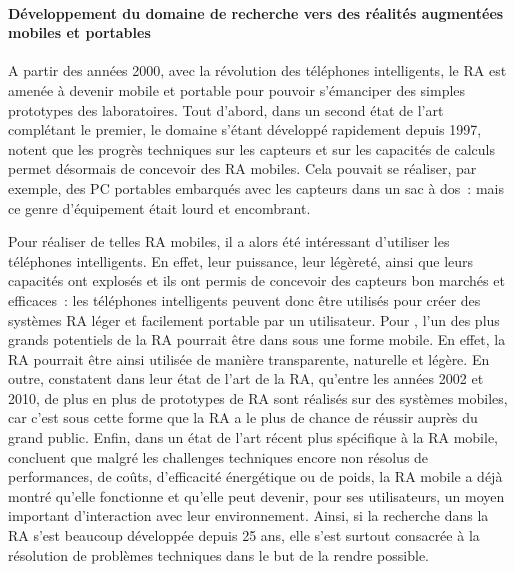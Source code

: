 
\paragraph*{Développement du domaine de recherche vers des réalités augmentées mobiles et portables}
A partir des années 2000, avec la révolution des téléphones intelligents, le RA est amenée à devenir mobile et portable pour pouvoir s'émanciper des simples prototypes des laboratoires. Tout d'abord, dans un second état de l'art complétant le premier, le domaine s'étant développé rapidement depuis 1997, \citet{AzumaBaillotBehringerEtAl2001} notent que les progrès techniques sur les capteurs et sur les capacités de calculs permet désormais de concevoir des RA mobiles. Cela pouvait se réaliser, par exemple, des PC portables embarqués avec les capteurs dans un sac à dos~: mais ce genre d'équipement était lourd et encombrant. \citep{DeSaChurchill2013}

Pour réaliser de telles RA mobiles, il a alors été intéressant d'utiliser les téléphones intelligents. En effet, leur puissance, leur légèreté, ainsi que leurs capacités ont explosés et ils ont permis de concevoir des capteurs bon marchés et efficaces~: les téléphones intelligents peuvent donc être utilisés pour créer des systèmes RA léger et facilement portable par un utilisateur. \citep{ZhouDuhBillinghurst2008} \citep{DeSaChurchill2013} Pour \citet{VanKrevelenPoelman2010}, l'un des plus grands potentiels de la RA pourrait être dans sous une forme mobile. En effet, la RA pourrait être ainsi utilisée de manière transparente, naturelle et légère. En outre, \citet{CarmignianiFurhtAnisettiEtAl2011} constatent dans leur état de l'art de la RA, qu'entre les années 2002 et 2010, de plus en plus de prototypes de RA sont réalisés sur des systèmes mobiles, car c'est sous cette forme que la RA a le plus de chance de réussir auprès du grand public. Enfin, dans un état de l'art récent plus spécifique à la RA mobile, \citet{HuangHuiPeyloEtAl2013} concluent que malgré les challenges techniques encore non résolus de performances, de coûts, d'efficacité énergétique ou de poids, la RA mobile a déjà montré qu'elle fonctionne et qu'elle peut devenir, pour ses utilisateurs, un moyen important d’interaction avec leur environnement. Ainsi, si la recherche dans la RA s'est beaucoup développée depuis 25 ans, elle s'est surtout consacrée à la résolution de problèmes techniques dans le but de la rendre possible.




